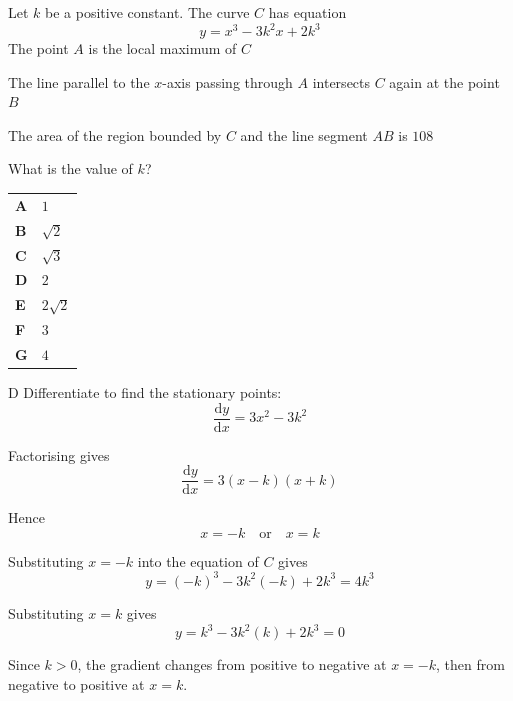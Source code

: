 \documentclass[11pt,a4paper]{article}
\begin{document}
\clearpage
\thispagestyle{djssolutions}
\vspace*{8pt}
\begin{enumerate}[label=\textbf{\arabic*.},leftmargin=*,itemsep=0pt,start=17]
\questionitem[Integration]
Let $k$ be a positive constant. The curve $C$ has equation \[y = x^3 - 3k^2 x + 2k^3\]
The point $A$ is the local maximum of $C$

The line parallel to the $x$-axis passing through $A$ intersects $C$ again at the point $B$

The area of the region bounded by $C$ and the line segment $AB$ is $108$

What is the value of $k$?

\par\vspace*{12pt}
\begin{tabularx}{\linewidth}{@{}>{\bfseries}l Y@{}}
A &
$1$
\\[0.8em]
B &
$\sqrt{2}$
\\[0.8em]
C &
$\sqrt{3}$
\\[0.8em]
D &
$2$
\\[0.8em]
E &
$2\sqrt{2}$
\\[0.8em]
F &
$3$
\\[0.8em]
G &
$4$
\\
\end{tabularx}

\begin{djsSolution}{D}
Differentiate to find the stationary points:
\[
\frac{\mathrm{d}y}{\mathrm{d}x}=3x^2-3k^2
\]

Factorising gives
\[
\frac{\mathrm{d}y}{\mathrm{d}x}=3(x-k)(x+k)
\]

Hence
\[
x=-k\quad\text{or}\quad x=k
\]

Substituting $x=-k$ into the equation of $C$ gives
\[
y=(-k)^3-3k^2(-k)+2k^3=4k^3
\]

Substituting $x=k$ gives
\[
y=k^3-3k^2(k)+2k^3=0
\]

Since $k>0$, the gradient changes from positive to negative at $x=-k$, then from negative to positive at $x=k$. 


\end{djsSolution}
\end{enumerate}
\end{document}
